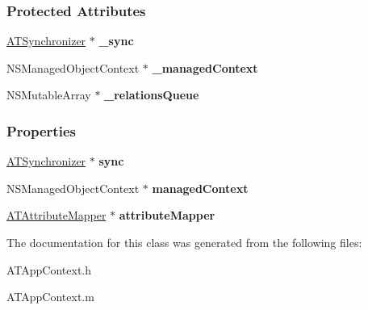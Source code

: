 \subsubsection*{Protected Attributes}
\begin{DoxyCompactItemize}
\item 
\hypertarget{interface_a_t_app_context_af1c6f509bc2183767278e1e687ffcc0e}{
\hyperlink{interface_a_t_synchronizer}{ATSynchronizer} $\ast$ {\bfseries \_\-sync}}
\label{interface_a_t_app_context_af1c6f509bc2183767278e1e687ffcc0e}

\item 
\hypertarget{interface_a_t_app_context_ade3e164d9ec290b1b752f749c84a57c1}{
NSManagedObjectContext $\ast$ {\bfseries \_\-managedContext}}
\label{interface_a_t_app_context_ade3e164d9ec290b1b752f749c84a57c1}

\item 
\hypertarget{interface_a_t_app_context_addad5fb48d0bb32ca07a120bde680072}{
NSMutableArray $\ast$ {\bfseries \_\-relationsQueue}}
\label{interface_a_t_app_context_addad5fb48d0bb32ca07a120bde680072}

\end{DoxyCompactItemize}
\subsubsection*{Properties}
\begin{DoxyCompactItemize}
\item 
\hypertarget{interface_a_t_app_context_a9e4d6b12a7d2db4e642504ec45744a85}{
\hyperlink{interface_a_t_synchronizer}{ATSynchronizer} $\ast$ {\bfseries sync}}
\label{interface_a_t_app_context_a9e4d6b12a7d2db4e642504ec45744a85}

\item 
\hypertarget{interface_a_t_app_context_a38c53145eccd1f4fbbbea4a081dfd81e}{
NSManagedObjectContext $\ast$ {\bfseries managedContext}}
\label{interface_a_t_app_context_a38c53145eccd1f4fbbbea4a081dfd81e}

\item 
\hypertarget{interface_a_t_app_context_adc64825f25a7e7c6695ddcc8cc265822}{
\hyperlink{interface_a_t_attribute_mapper}{ATAttributeMapper} $\ast$ {\bfseries attributeMapper}}
\label{interface_a_t_app_context_adc64825f25a7e7c6695ddcc8cc265822}

\end{DoxyCompactItemize}


The documentation for this class was generated from the following files:\begin{DoxyCompactItemize}
\item 
ATAppContext.h\item 
ATAppContext.m\end{DoxyCompactItemize}
